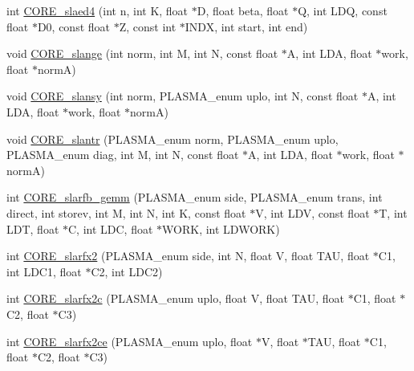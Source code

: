 \begin{DoxyCompactItemize}
\item 
int \hyperlink{group__CORE__float_gab0814ef59fb761066ca6a1ae632b8d9e_gab0814ef59fb761066ca6a1ae632b8d9e}{C\+O\+R\+E\+\_\+slaed4} (int n, int K, float $\ast$D, float beta, float $\ast$Q, int L\+D\+Q, const float $\ast$D0, const float $\ast$Z, const int $\ast$I\+N\+D\+X, int start, int end)
\item 
void \hyperlink{group__CORE__float_ga3e031864b8cad5bc7e1041e65c3f70cd_ga3e031864b8cad5bc7e1041e65c3f70cd}{C\+O\+R\+E\+\_\+slange} (int norm, int M, int N, const float $\ast$A, int L\+D\+A, float $\ast$work, float $\ast$norm\+A)
\item 
void \hyperlink{group__CORE__float_ga7b02f1be9946f1d04794babf848b93aa_ga7b02f1be9946f1d04794babf848b93aa}{C\+O\+R\+E\+\_\+slansy} (int norm, P\+L\+A\+S\+M\+A\+\_\+enum uplo, int N, const float $\ast$A, int L\+D\+A, float $\ast$work, float $\ast$norm\+A)
\item 
void \hyperlink{group__CORE__float_ga6df3e0b87c0490252ff01fe5c84f4438_ga6df3e0b87c0490252ff01fe5c84f4438}{C\+O\+R\+E\+\_\+slantr} (P\+L\+A\+S\+M\+A\+\_\+enum norm, P\+L\+A\+S\+M\+A\+\_\+enum uplo, P\+L\+A\+S\+M\+A\+\_\+enum diag, int M, int N, const float $\ast$A, int L\+D\+A, float $\ast$work, float $\ast$norm\+A)
\item 
int \hyperlink{group__CORE__float_ga65b75a67e40e93b0d6a1a07a6f13c047_ga65b75a67e40e93b0d6a1a07a6f13c047}{C\+O\+R\+E\+\_\+slarfb\+\_\+gemm} (P\+L\+A\+S\+M\+A\+\_\+enum side, P\+L\+A\+S\+M\+A\+\_\+enum trans, int direct, int storev, int M, int N, int K, const float $\ast$V, int L\+D\+V, const float $\ast$T, int L\+D\+T, float $\ast$C, int L\+D\+C, float $\ast$W\+O\+R\+K, int L\+D\+W\+O\+R\+K)
\item 
int \hyperlink{group__CORE__float_ga31442e2222153f6ceb63d193f9d4585b_ga31442e2222153f6ceb63d193f9d4585b}{C\+O\+R\+E\+\_\+slarfx2} (P\+L\+A\+S\+M\+A\+\_\+enum side, int N, float V, float T\+A\+U, float $\ast$C1, int L\+D\+C1, float $\ast$C2, int L\+D\+C2)
\item 
int \hyperlink{group__CORE__float_gac467f3171564a7d58d1602a56887c7a5_gac467f3171564a7d58d1602a56887c7a5}{C\+O\+R\+E\+\_\+slarfx2c} (P\+L\+A\+S\+M\+A\+\_\+enum uplo, float V, float T\+A\+U, float $\ast$C1, float $\ast$C2, float $\ast$C3)
\item 
int \hyperlink{group__CORE__float_ga1a8e3e6eda275709b07fd7c7203b1deb_ga1a8e3e6eda275709b07fd7c7203b1deb}{C\+O\+R\+E\+\_\+slarfx2ce} (P\+L\+A\+S\+M\+A\+\_\+enum uplo, float $\ast$V, float $\ast$T\+A\+U, float $\ast$C1, float $\ast$C2, float $\ast$C3)

\end{DoxyCompactItemize}
